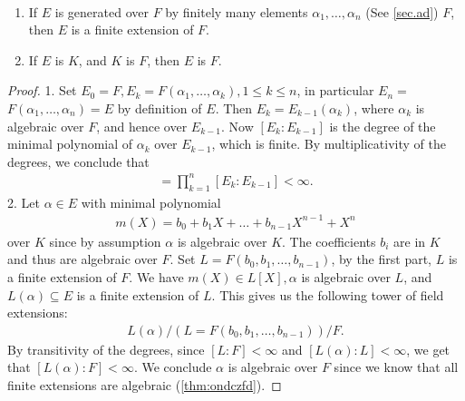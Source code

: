 \documentclass{article}
\begin{document}
\begin{thma}\label{thm:odnadcqee}$\quad$
\begin{enumerate}
    \item If $E$ is generated over $F$ by finitely many elements $\alpha_{1}, \ldots, \alpha_{n}$  (See \cref{sec.ad}) $F$, then $E$ is a finite extension of $F$.
    \item {} If $E$ is  $K$, and $K$ is  $F$, then $E$ is  $F$.
\end{enumerate}
\end{thma}
\begin{proof}
1. Set $E_{0}=F, E_{k}=F\left(\alpha_{1}, \ldots, \alpha_{k}\right), 1 \leq k \leq n$, in particular $E_{n}=$ $F\left(\alpha_{1}, \ldots, \alpha_{n}\right)=E$ by definition of $E$. Then $E_{k}=E_{k-1}\left(\alpha_{k}\right)$, where $\alpha_{k}$ is algebraic over $F$, and hence over $E_{k-1}$. Now $\left[E_{k}: E_{k-1}\right]$ is the degree of the minimal polynomial of $\alpha_{k}$ over $E_{k-1}$, which is finite. By multiplicativity of the degrees, we conclude that
\begin{align*}
[E: F]=\prod_{k=1}^{n}\left[E_{k}: E_{k-1}\right]<\infty .
\end{align*}
2. Let $\alpha \in E$ with minimal polynomial
\begin{align*}
m(X)=b_{0}+b_{1} X+\ldots+b_{n-1} X^{n-1}+X^{n}
\end{align*}
over $K$ since by assumption $\alpha$ is algebraic over $K$. The coefficients $b_{i}$ are in $K$ and thus are algebraic over $F$. Set $L=F\left(b_{0}, b_{1}, \ldots, b_{n-1}\right)$, by the first part, $L$ is a finite extension of $F$. We have $m(X) \in L[X], \alpha$ is algebraic over $L$, and $L(\alpha)\subseteq E$ is a finite extension of  $L$. This gives us the following tower of field extensions:
\begin{align*}
L(\alpha) / \left(L=F\left(b_{0}, b_{1}, \ldots, b_{n-1}\right) \right)/ F .
\end{align*}
By transitivity of the degrees, since $[L: F]<\infty$ and $[L(\alpha): L]<\infty$, we get that $[L(\alpha): F]<\infty$. We conclude  $\alpha$ is algebraic over $F$ since we know that all finite extensions are algebraic (\cref{thm:ondczfd}).
\end{proof}
\end{document}
